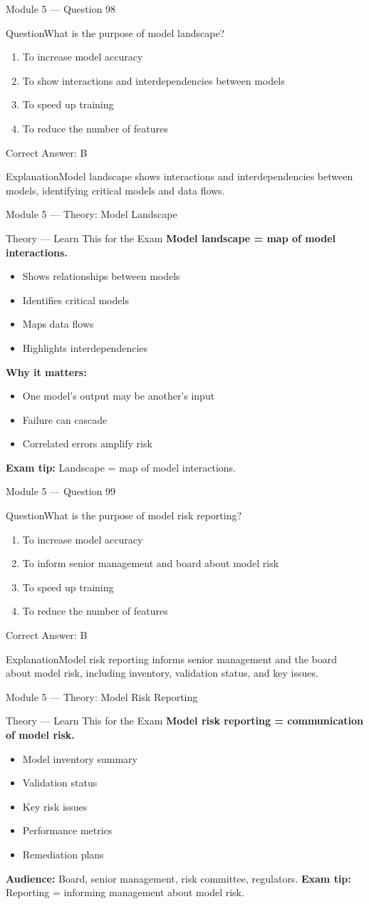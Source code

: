 \documentclass[aspectratio=169,10pt]{beamer}
\newcommand{\question}[1]{\begin{block}{Question}#1\end{block}}
\newcommand{\options}[4]{%
	\begin{enumerate}[label=\Alph*.,leftmargin=*]
		\item #1
		\item #2
		\item #3
		\item #4
	\end{enumerate}
}
\newcommand{\answerbox}[1]{\begin{exampleblock}{Correct Answer: #1}\end{exampleblock}}
\newcommand{\explain}[1]{\begin{block}{Explanation}#1\end{block}}
\newcommand{\theory}[1]{%
	\begin{block}{Theory --- Learn This for the Exam}
		\small #1
	\end{block}
}
\begin{document}
	\begin{frame}{Module 5 --- Question 98}
		\question{What is the purpose of model landscape?}
		\options{To increase model accuracy}{To show interactions and interdependencies between models}{To speed up training}{To reduce the number of features}
		\answerbox{B}
		\explain{Model landscape shows interactions and interdependencies between models, identifying critical models and data flows.}
	\end{frame}
	
	\begin{frame}{Module 5 --- Theory: Model Landscape}
		\theory{
			\textbf{Model landscape = map of model interactions.}
			\begin{itemize}
				\item Shows relationships between models
				\item Identifies critical models
				\item Maps data flows
				\item Highlights interdependencies
			\end{itemize}
			\textbf{Why it matters:}
			\begin{itemize}
				\item One model's output may be another's input
				\item Failure can cascade
				\item Correlated errors amplify risk
			\end{itemize}
			\textbf{Exam tip:} Landscape = map of model interactions.
		}
	\end{frame}
	
	\begin{frame}{Module 5 --- Question 99}
		\question{What is the purpose of model risk reporting?}
		\options{To increase model accuracy}{To inform senior management and board about model risk}{To speed up training}{To reduce the number of features}
		\answerbox{B}
		\explain{Model risk reporting informs senior management and the board about model risk, including inventory, validation status, and key issues.}
	\end{frame}
	
	\begin{frame}{Module 5 --- Theory: Model Risk Reporting}
		\theory{
			\textbf{Model risk reporting = communication of model risk.}
			\begin{itemize}
				\item Model inventory summary
				\item Validation status
				\item Key risk issues
				\item Performance metrics
				\item Remediation plans
			\end{itemize}
			\textbf{Audience:} Board, senior management, risk committee, regulators.
			\textbf{Exam tip:} Reporting = informing management about model risk.
		}
	\end{frame}
	
\end{document}

